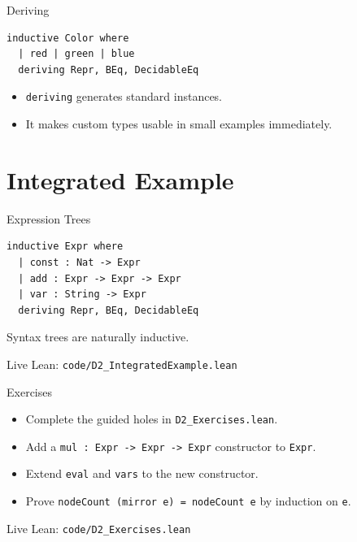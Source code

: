 ﻿\documentclass[aspectratio=169,11pt]{beamer}
\newcommand{\leanfile}[1]{\vfill{\small\color{gray}Live Lean: \texttt{#1}}}
\begin{document}
\begin{frame}[fragile]{Deriving}
  \begin{lstlisting}
inductive Color where
  | red | green | blue
  deriving Repr, BEq, DecidableEq
  \end{lstlisting}

  \begin{itemize}
    \item \texttt{deriving} generates standard instances.
    \item It makes custom types usable in small examples immediately.
  \end{itemize}
\end{frame}

\section{Integrated Example}

\begin{frame}[fragile]{Expression Trees}
  \begin{lstlisting}
inductive Expr where
  | const : Nat -> Expr
  | add : Expr -> Expr -> Expr
  | var : String -> Expr
  deriving Repr, BEq, DecidableEq
  \end{lstlisting}

  Syntax trees are naturally inductive.

  \leanfile{code/D2\_IntegratedExample.lean}
\end{frame}

\begin{frame}{Exercises}
  \begin{itemize}
    \item Complete the guided holes in \texttt{D2\_Exercises.lean}.
    \item Add a \texttt{mul : Expr -> Expr -> Expr} constructor to \texttt{Expr}.
    \item Extend \texttt{eval} and \texttt{vars} to the new constructor.
    \item Prove \texttt{nodeCount (mirror e) = nodeCount e} by induction on \texttt{e}.
  \end{itemize}

  \leanfile{code/D2\_Exercises.lean}
\end{frame}
\end{document}

